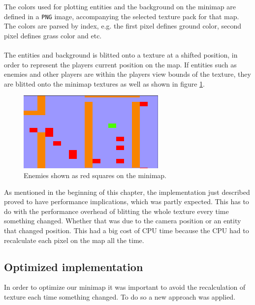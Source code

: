 The colors used for plotting entities and the background on the minimap are
defined in a \texttt{PNG} image, accompanying the selected texture pack for that
map. The colors are parsed by index, e.g. the first pixel defines ground
color, second pixel defines grass color and etc.
\\
\\
The entities and background is blitted onto a texture at a shifted position, in
order to represent the players current position on the map. If entities such as
enemies and other players are within the players view bounds of the
texture, they are blitted onto the minimap textures as well as shown in figure \ref{minimap:enemies}.
\\
\begin{figure}
	\centering
    \includegraphics[scale=.5]{figures/minimap/enemies_on_minimap.png}
    \caption{Enemies shown as red squares on the minimap.}
    \label{minimap:enemies}
\end{figure}

As mentioned in the beginning of this chapter, the implementation just
described proved to have performance implications, which was partly expected. 
This has to do with the performance overhead of blitting the whole texture every time something changed.
Whether that was due to the camera position or an entity that changed position.
This had a big cost of CPU time because the CPU had to recalculate each pixel on the map all the time.


\subsection{Optimized implementation}
In order to optimize our minimap it was important to avoid the recalculation of texture each time something changed.
To do so a new approach was applied.

